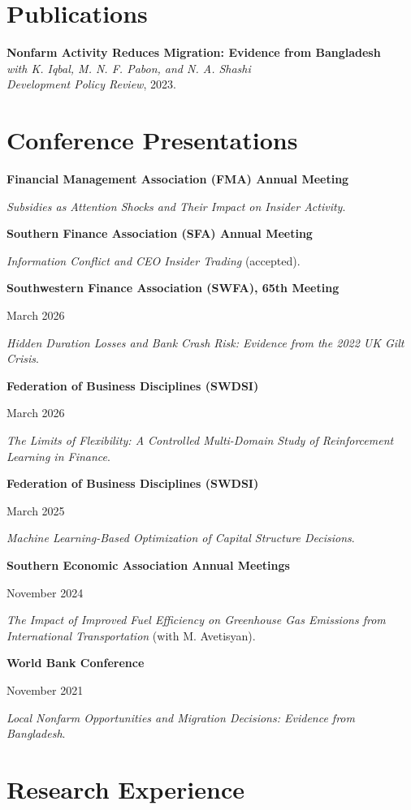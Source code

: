 \documentclass[11pt,letterpaper]{article}
\newcommand{\entry}[2]{%
  \noindent\begin{minipage}[t]{0.72\textwidth}\raggedright #1\end{minipage}%
  \hfill%
  \begin{minipage}[t]{0.27\textwidth}\raggedleft #2\end{minipage}\par
}
\newcommand{\hgap}{\par\vspace{3pt}}
\newcommand{\smallgap}{\par\vspace{5pt}}
\begin{document}
\section{Publications}

\textbf{Nonfarm Activity Reduces Migration: Evidence from Bangladesh}\\[3pt]
\textit{with K. Iqbal, M. N. F. Pabon, and N. A. Shashi}\\
\textit{Development Policy Review}, 2023.

\section{Conference Presentations}

\entry{\textbf{Financial Management Association (FMA) Annual Meeting}}{2026}
\hgap
\textit{Subsidies as Attention Shocks and Their Impact on Insider Activity}.
\smallgap

\entry{\textbf{Southern Finance Association (SFA) Annual Meeting}}{2026}
\hgap
\textit{Information Conflict and CEO Insider Trading} (accepted).
\smallgap

\entry{\textbf{Southwestern Finance Association (SWFA), 65th Meeting}}{March 2026}
\hgap
\textit{Hidden Duration Losses and Bank Crash Risk: Evidence from the 2022 UK Gilt Crisis}.
\smallgap

\entry{\textbf{Federation of Business Disciplines (SWDSI)}}{March 2026}
\hgap
\textit{The Limits of Flexibility: A Controlled Multi-Domain Study of Reinforcement Learning in Finance}.
\smallgap

\entry{\textbf{Federation of Business Disciplines (SWDSI)}}{March 2025}
\hgap
\textit{Machine Learning-Based Optimization of Capital Structure Decisions}.
\smallgap

\entry{\textbf{Southern Economic Association Annual Meetings}}{November 2024}
\hgap
\textit{The Impact of Improved Fuel Efficiency on Greenhouse Gas Emissions from International
Transportation} (with M. Avetisyan).
\smallgap

\entry{\textbf{World Bank Conference}}{November 2021}
\hgap
\textit{Local Nonfarm Opportunities and Migration Decisions: Evidence from Bangladesh}.

\section{Research Experience}
\end{document}
